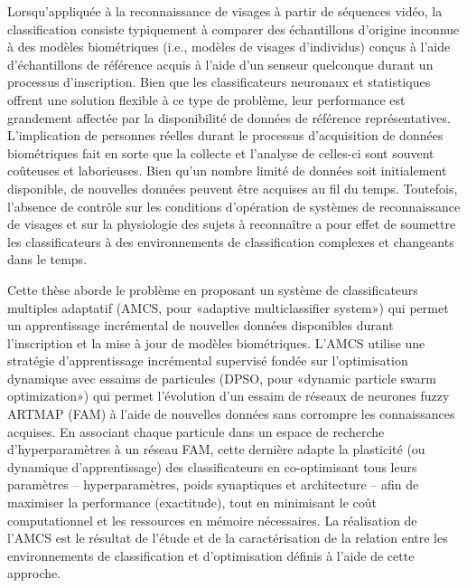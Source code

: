 Lorsqu'appliquée à la reconnaissance de visages à partir de séquences vidéo, la classification consiste typiquement à comparer des échantillons d'origine inconnue à des modèles biométriques (i.e., modèles de visages d’individus) conçus à l'aide d'échantillons de référence acquis à l’aide d’un senseur quelconque durant un processus d’inscription. Bien que les classificateurs neuronaux et statistiques offrent une solution flexible à ce type de problème, leur performance est grandement affectée par la disponibilité de données de référence représentatives. L'implication de personnes réelles durant le processus d’acquisition de données biométriques fait en sorte que la collecte et l’analyse de celles-ci sont souvent coûteuses et laborieuses. Bien qu'un nombre limité de données soit initialement disponible, de nouvelles données peuvent être acquises au fil du temps. Toutefois, l’absence de contrôle sur les conditions d’opération de systèmes de reconnaissance de visages et sur la physiologie des sujets à reconnaître a pour effet de soumettre les classificateurs à des environnements de classification complexes et changeants dans le temps.

Cette thèse aborde le problème en proposant un système de classificateurs multiples adaptatif (AMCS, pour «adaptive multiclassifier system») qui permet un apprentissage incrémental de nouvelles données disponibles durant l’inscription et la mise à jour de modèles biométriques. L'AMCS utilise une stratégie d’apprentissage incrémental supervisé fondée sur l’optimisation dynamique avec essaims de particules (DPSO, pour «dynamic particle swarm optimization») qui permet l’évolution d’un essaim de réseaux de neurones fuzzy ARTMAP (FAM) à l’aide de nouvelles données sans corrompre les connaissances acquises. En associant chaque particule dans un espace de recherche d’hyperparamètres à un réseau FAM, cette dernière adapte la plasticité (ou dynamique d’apprentissage) des classificateurs en co-optimisant tous leurs paramètres – hyperparamètres, poids synaptiques et architecture – afin de maximiser la performance  (exactitude), tout en minimisant le coût computationnel et les ressources en mémoire nécessaires. La réalisation de l’AMCS est le résultat de l'étude et de la caractérisation de la relation entre les environnements de classification et d’optimisation définis à l’aide de cette approche.

